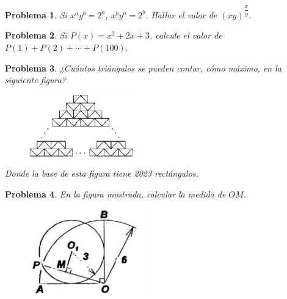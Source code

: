 \documentclass[12pt]{beamer}
\newtheorem{section-problem}{Problema}
\begin{document}
   \begin{frame}

      \begin{section-problem}
         Si $x^a y^b = 2^a$, $x^b y^a = 2^b$.
         Hallar el valor de $(xy)^{\dfrac{x}{y}}.$
      \end{section-problem}
   \end{frame}

   \begin{frame}
      \begin{section-problem}
         Si $P(x) = x^2 + 2x + 3$, calcule el valor de $P(1) + P(2) + \cdots + P(100).$
      \end{section-problem}
   \end{frame}

   \begin{frame}
      \begin{section-problem}
         ¿Cuántos triángulos se pueden contar, cómo máximo, en la siguiente figura?
         \begin{figure}[htb]
            \centering
            \includegraphics[width=4.5cm]{figura}
         \end{figure}
         Donde la base de esta figura tiene 2023 rectángulos.
      \end{section-problem}
   \end{frame}

   \begin{frame}
      \begin{section-problem}
         En la figura mostrada, calcular la medida de $OM$.
         \begin{figure}[htb]
            \centering
            \includegraphics[width=5cm]{image2.geo}
         \end{figure}
      \end{section-problem}
   \end{frame}
\end{document}
